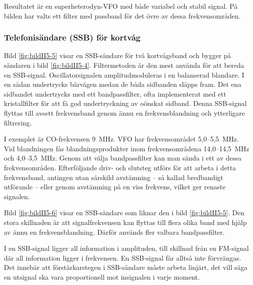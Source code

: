 Resultatet är en superheterodyn-VFO med både variabel och stabil
signal.
På bilden har valts ett filter med passband för det övre av dessa
frekvensområden.

\subsubsection{Telefonisändare (SSB) för kortvåg}


Bild \ref{fig:bildII5-5} visar en SSB-sändare för två kortvågsband och
bygger på sändaren i bild \ref{fig:bildII5-4}.
Filtermetoden är den mest använda för att bereda en SSB-signal.
Oscillatorsignalen amplitudmoduleras i en balanserad blandare.
I en sådan undertrycks bärvågen medan de båda sidbanden släpps fram.
Det ena sidbandet undertrycks med ett bandpassfilter, ofta implementerat med
ett kristallfilter för att få god undertryckning av oönskat sidband.
Denna SSB-signal flyttas till avsett frekvensband
genom ännu en frekvensblandning och ytterligare filtrering.

I exemplet är CO-frekvensen 9~MHz. VFO har frekvensområdet 5,0--5,5~MHz.
Vid blandningen fås blandningsprodukter inom frekvensområdena
14,0--14,5~MHz och 4,0--3,5~MHz.
Genom att välja bandpassfilter kan man sända i ett av dessa frekvensområden.
Efterföljande driv- och slutsteg utförs för att arbeta i detta frekvensband,
antingen utan särskild avstämning -- så kallad bredbandigt utförande -- eller
genom avstämning på en viss frekvens, vilket ger renaste signalen.

Bild \ref{fig:bildII5-6} visar en SSB-sändare som liknar den i
bild \ref{fig:bildII5-5}.
Den stora skillnaden är att signalfrekvensen kan flyttas till flera olika band
med hjälp av ännu en frekvensblandning.
Därför används fler valbara bandpassfilter.


I en SSB-signal ligger all information i amplituden, till skillnad
från en FM-signal där all information ligger i frekvensen.
En SSB-signal får alltså inte förvrängas.
Det innebär att förstärkarstegen i SSB-sändare måste arbeta linjärt, det vill
säga en utsignal ska vara proportionell mot insignalen i varje moment.

